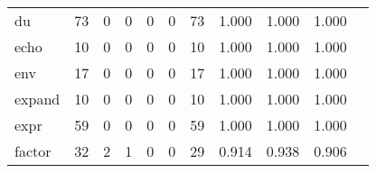 \begin{longtable}{lp{1.2cm}p{1.2cm}p{1.2cm}p{1.2cm}p{1.2cm}p{1.2cm}p{1.2cm}p{1.2cm}p{1.2cm}p{1.2cm}}
du        &                                    73 &                                                  0 &                                                  0 &                                                  0 &                                                  0 &                                                 73 &                                              1.000 &                                              1.000 &                                              1.000 \\
echo      &                                    10 &                                                  0 &                                                  0 &                                                  0 &                                                  0 &                                                 10 &                                              1.000 &                                              1.000 &                                              1.000 \\
env       &                                    17 &                                                  0 &                                                  0 &                                                  0 &                                                  0 &                                                 17 &                                              1.000 &                                              1.000 &                                              1.000 \\
expand    &                                    10 &                                                  0 &                                                  0 &                                                  0 &                                                  0 &                                                 10 &                                              1.000 &                                              1.000 &                                              1.000 \\
expr      &                                    59 &                                                  0 &                                                  0 &                                                  0 &                                                  0 &                                                 59 &                                              1.000 &                                              1.000 &                                              1.000 \\
factor    &                                    32 &                                                  2 &                                                  1 &                                                  0 &                                                  0 &                                                 29 &                                              0.914 &                                              0.938 &                                              0.906 \\

\end{longtable}
